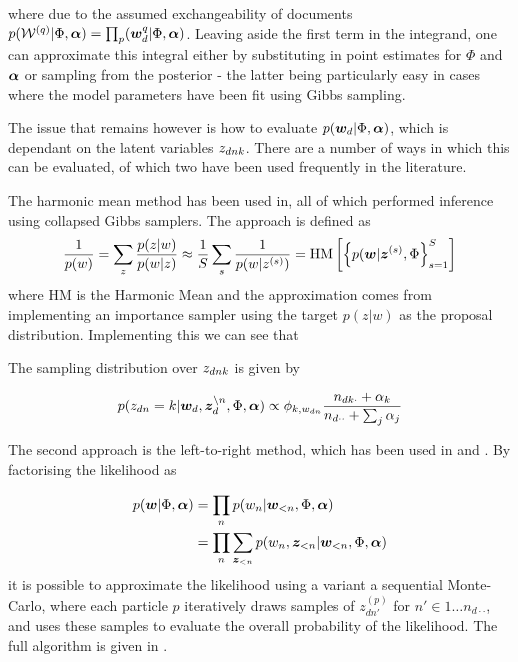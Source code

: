 where due to the assumed exchangeability of documents $p(\mathcal{W}^{(q)}|\Phi, \bm \alpha) = \prod_ p(\bm w_d^{q}|\Phi, \bm \alpha)$. Leaving aside the first term in the integrand, one can approximate this integral either by substituting in point estimates for $\Phi$ and $\bm \alpha$ or sampling from the posterior - the latter being particularly easy in cases where the model parameters have been fit using Gibbs sampling.

The issue that remains however is how to evaluate $p(\bm w_d|\Phi, \bm \alpha)$, which is dependant on the latent variables ${ z_{dnk} }$. There are a number of ways in which this can be evaluated, of which two have been used frequently in the literature.

The harmonic mean method has been used in\cite{Griffiths2004}\cite{Griffiths2005}\cite{Wallach2006}, all of which performed inference using collapsed Gibbs samplers. The approach is defined as
\begin{align}
\frac{1}{ {p(w)} } = \sum_z \frac{p(z|w)}{p(w|z)} \approx \frac{1}{ {S} } \sum_s \frac{1}{ {p(w|{ z }^{(s)})} }
=  \text{HM}\left[ \left\{ p(\bm w|{ \bm z }^{(s)}, \Phi \right\}_{s=1}^{S}  \right]
\end{align}
where HM is the Harmonic Mean and the approximation comes from implementing an importance sampler using the target $p(z|w)$ as the proposal distribution. Implementing this we can see that 

The sampling distribution over ${ z_{dnk} }$ is given by

\begin{align}
p(z_{dn} = k | \bm w_d, \bm z_d^{\setminus n}, \Phi, \bm \alpha) \propto \phi_{k,{w_{dn}}}\frac{n_{dk\cdot} + \alpha_k}{n_{d\cdot\cdot} + \sum_j \alpha_j}
\end{align}

The second approach is the left-to-right method, which has been used in \cite{Mimno2011} and \cite{Mimno2012a}. By factorising the likelihood as

\begin{align}
p(\bm w|\Phi, \bm \alpha) & = \prod_n p(w_n | \bm w_{<n}, \Phi, \bm \alpha) \\
& = \prod_n \sum_{\bm z_{<n}} p(w_n, \bm z_{<n}| \bm w_{<n}, \Phi, \bm \alpha)
\end{align}
it is possible to approximate the likelihood using a variant a sequential Monte-Carlo, where each particle $p$ iteratively draws samples of $z^{(p)}_{dn'}$ for $n' \in 1 \ldots n_{d\cdot\cdot}$, and uses these samples to evaluate the overall probability of the likelihood. The full algorithm is given in \cite{Wallach2009}.

